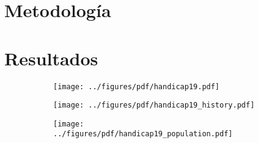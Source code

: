 \documentclass[shownotes]{beamer}
\begin{document}
\section{Metodolog\'ia}
\begin{frame}
 


\end{frame}

\section{Resultados}

\begin{frame}
  \begin{figure}[H]     
     \centering \normalsize
     \begin{subfigure}[b]{0.8\textwidth}
     \texttt{[image: ../figures/pdf/handicap19.pdf]} 
     \end{subfigure}
  \end{figure}
\end{frame}

\begin{frame}
  \begin{figure}[H]     
     \centering \normalsize
     \begin{subfigure}[b]{0.8\textwidth}
     \texttt{[image: ../figures/pdf/handicap19\_history.pdf]} 
     \end{subfigure}
  \end{figure}
\end{frame}

\begin{frame}
  \begin{figure}[H]     
     \centering \normalsize
     \begin{subfigure}[b]{0.8\textwidth}
     \texttt{[image: ../figures/pdf/handicap19\_population.pdf]} 
     \end{subfigure}
  \end{figure}
\end{frame}
\end{document}
